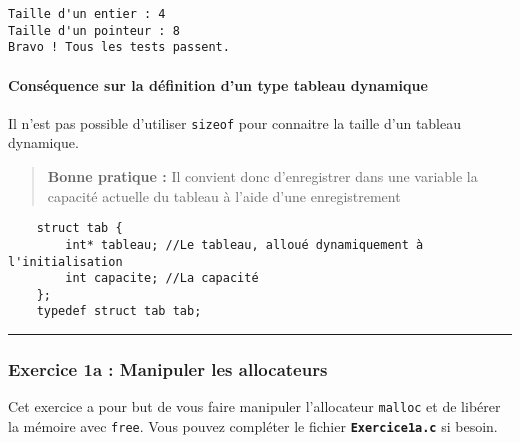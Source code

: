 \documentclass[11pt]{article}
\begin{document}
    \begin{Verbatim}[commandchars=\\\{\}]
Taille d'un entier : 4
Taille d'un pointeur : 8
Bravo ! Tous les tests passent.

    \end{Verbatim}

    \paragraph{Conséquence sur la définition d'un type tableau
dynamique}\label{consuxe9quence-sur-la-duxe9finition-dun-type-tableau-dynamique}

Il n'est pas possible d'utiliser \texttt{sizeof} pour connaitre la
taille d'un tableau dynamique.

\begin{quote}
\textbf{Bonne pratique :} Il convient donc d'enregistrer dans une
variable la capacité actuelle du tableau à l'aide d'une enregistrement
\end{quote}

\begin{verbatim}
    struct tab {
        int* tableau; //Le tableau, alloué dynamiquement à l'initialisation
        int capacite; //La capacité
    };
    typedef struct tab tab;
\end{verbatim}

    \begin{center}\rule{0.5\linewidth}{\linethickness}\end{center}

    \subsubsection{Exercice 1a : Manipuler les
allocateurs}\label{exercice-1a-manipuler-les-allocateurs}

Cet exercice a pour but de vous faire manipuler l'allocateur
\texttt{malloc} et de libérer la mémoire avec \texttt{free}. Vous pouvez
compléter le fichier \textbf{\texttt{Exercice1a.c}} si besoin.
\end{document}

